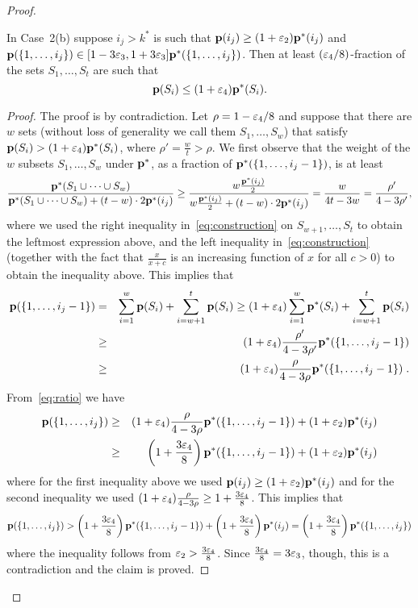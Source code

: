 \begin{proof}
\begin{claim} \label{clm:truth-will-out}
In Case~2(b) suppose $i_j > k^\ast$ is such that
$\mathbf{p}(i_j) \geq (1+{\varepsilon_2})\mathbf{p}^\ast(i_j)$ and
$\mathbf{p}(\{1,\dots,i_j\}) \in
[1-3{\varepsilon_3},1+3{\varepsilon_3}]\mathbf{p}^\ast(\{1,\dots,i_j\})$.
Then at least $(\varepsilon_4/8)$-fraction of the sets $S_1,\dots,S_t$
are such that
\[
\mathbf{p}(S_i) \leq (1 + {\varepsilon_4}) \mathbf{p}^\ast(S_i).
\]
\end{claim}

\begin{proof}
The proof is by contradiction.
Let $\rho = 1- \varepsilon_4/8$ and suppose that there are $w$ sets (without loss of generality we
call them $S_1,\dots,S_w$) that satisfy $\mathbf{p}(S_i) > (1+{\varepsilon_4})\mathbf{p}^\ast(S_i)$, where $\rho' = {\frac w t} > \rho.$
We first observe that the weight of the $w$ subsets $S_1,\dots,S_w$ under $\mathbf{p}^\ast$,
as a fraction of $\mathbf{p}^\ast(\{1,\dots,i_j-1\})$, is at least
\[
{\frac {\mathbf{p}^\ast(S_1 \cup \dots \cup S_w)}
{\mathbf{p}^\ast(S_1 \cup \dots \cup S_w) + (t-w) \cdot 2 \mathbf{p}^\ast(i_j)}} \geq
{\frac {w {\frac {\ensuremath{\mathbf{p}}^\ast(i_{j})} 2}}
{w {\frac {\ensuremath{\mathbf{p}}^\ast(i_j)} 2} + (t-w) \cdot 2 \ensuremath{\mathbf{p}}^\ast(i_j)}}
= {\frac w {4t - 3w}} = {\frac {\rho'}{4-3\rho'}},
\]
where we used the right inequality in~\cref{eq:construction} on
$S_{w+1},\dots,S_t$ to obtain the leftmost expression above, and the left inequality
in~\cref{eq:construction} (together with the fact that ${\frac x {x+c}}$ is an increasing function of
$x$ for all $c>0$) to obtain the inequality above.
This implies that
\begin{eqnarray}
\mathbf{p}(\{1,\dots,i_j-1\}) &=&
\sum_{i=1}^w \mathbf{p}(S_i) +
\sum_{i=w+1}^t \mathbf{p}(S_i) \geq
(1+{\varepsilon_4}) \sum_{i=1}^w \mathbf{p}^\ast(S_i) + \sum_{i=w+1}^t \mathbf{p}(S_i) \nonumber \\
&\geq&
(1+{\varepsilon_4}) {\frac {\rho'}{4-3\rho'}} \mathbf{p}^\ast(\{1,\dots,i_j-1\}) \nonumber \\
&\geq&
(1+{\varepsilon_4}) {\frac {\rho}{4-3\rho}} \mathbf{p}^\ast(\{1,\dots,i_j-1\})\;. \label{eq:ratio}
\end{eqnarray}
From~\cref{eq:ratio} we have
\begin{eqnarray*}
\mathbf{p}(\{1,\dots,i_j\}) &\geq&
(1+{\varepsilon_4}) {\frac {\rho}{4-3\rho}} \mathbf{p}^\ast(\{1,\dots,i_j-1\}) + (1 + {\varepsilon_2}) \mathbf{p}^\ast(i_j)\\
&\geq& \left(1 + \frac{3\varepsilon_4}{8}\right)
\mathbf{p}^\ast(\{1,\dots,i_j-1\}) + (1 + {\varepsilon_2}) \mathbf{p}^\ast(i_j)
\end{eqnarray*}
where for the first inequality above we used $\mathbf{p}(i_j) \geq (1+{\varepsilon_2})\mathbf{p}^\ast(i_j)$ and for the second inequality we used $(1+{\varepsilon_4}) {\frac {\rho}{4-3\rho}}  \geq 1 + \frac{3\varepsilon_4}{8}$. This implies that
\[
\mathbf{p}(\{1,\dots,i_j\}) > \left(1 + \frac{3\varepsilon_4}{8}\right) \mathbf{p}^\ast(\{1,\dots,i_j-1\}) + \left(1 + {\frac {3 {\varepsilon_4}} 8}\right) \mathbf{p}^\ast(i_j) 
= \left( 1 + \frac{3\varepsilon_4}{8} \right) \mathbf{p}^\ast(\{1,\dots,i_j\})
\]
where the inequality follows from $\varepsilon_2 > \frac{3 \varepsilon_4}{8}$.
Since ${\frac {3 {\varepsilon_4}} 8} = 3{\varepsilon_3}$, though, this is a contradiction and the claim is proved.
\end{proof}



\end{proof}
